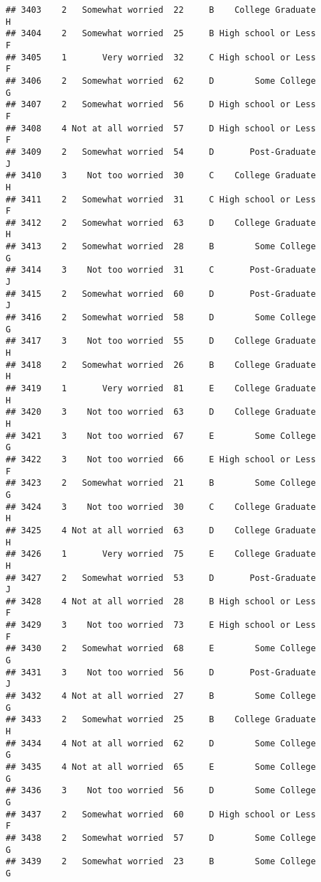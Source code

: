 \documentclass[
]{article}
\begin{document}
\begin{verbatim}
## 3403    2   Somewhat worried  22     B    College Graduate         H
## 3404    2   Somewhat worried  25     B High school or Less         F
## 3405    1       Very worried  32     C High school or Less         F
## 3406    2   Somewhat worried  62     D        Some College         G
## 3407    2   Somewhat worried  56     D High school or Less         F
## 3408    4 Not at all worried  57     D High school or Less         F
## 3409    2   Somewhat worried  54     D       Post-Graduate         J
## 3410    3    Not too worried  30     C    College Graduate         H
## 3411    2   Somewhat worried  31     C High school or Less         F
## 3412    2   Somewhat worried  63     D    College Graduate         H
## 3413    2   Somewhat worried  28     B        Some College         G
## 3414    3    Not too worried  31     C       Post-Graduate         J
## 3415    2   Somewhat worried  60     D       Post-Graduate         J
## 3416    2   Somewhat worried  58     D        Some College         G
## 3417    3    Not too worried  55     D    College Graduate         H
## 3418    2   Somewhat worried  26     B    College Graduate         H
## 3419    1       Very worried  81     E    College Graduate         H
## 3420    3    Not too worried  63     D    College Graduate         H
## 3421    3    Not too worried  67     E        Some College         G
## 3422    3    Not too worried  66     E High school or Less         F
## 3423    2   Somewhat worried  21     B        Some College         G
## 3424    3    Not too worried  30     C    College Graduate         H
## 3425    4 Not at all worried  63     D    College Graduate         H
## 3426    1       Very worried  75     E    College Graduate         H
## 3427    2   Somewhat worried  53     D       Post-Graduate         J
## 3428    4 Not at all worried  28     B High school or Less         F
## 3429    3    Not too worried  73     E High school or Less         F
## 3430    2   Somewhat worried  68     E        Some College         G
## 3431    3    Not too worried  56     D       Post-Graduate         J
## 3432    4 Not at all worried  27     B        Some College         G
## 3433    2   Somewhat worried  25     B    College Graduate         H
## 3434    4 Not at all worried  62     D        Some College         G
## 3435    4 Not at all worried  65     E        Some College         G
## 3436    3    Not too worried  56     D        Some College         G
## 3437    2   Somewhat worried  60     D High school or Less         F
## 3438    2   Somewhat worried  57     D        Some College         G
## 3439    2   Somewhat worried  23     B        Some College         G

\end{verbatim}
\end{document}
